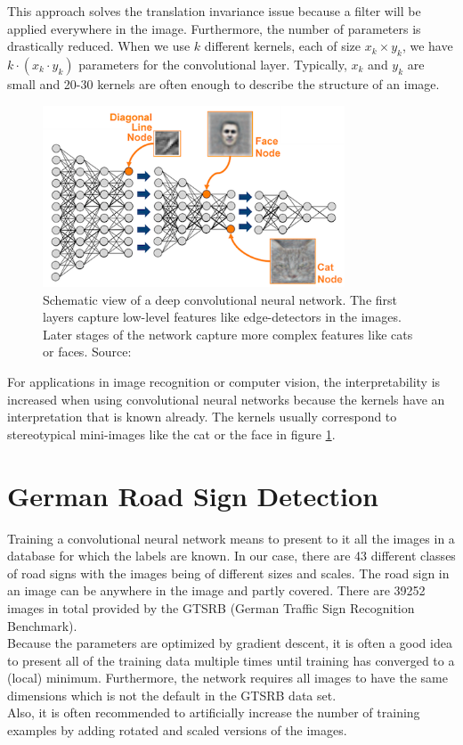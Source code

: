 \documentclass[11pt,a4paper]{article}
\begin{document}
This approach solves the translation invariance issue because a filter will be applied everywhere in the image. Furthermore, the number of parameters is drastically reduced. When we use $k$ different kernels, each of size $x_k \times y_k$, we have $k \cdot (x_k \cdot y_k)$ parameters for the convolutional layer. Typically, $x_k$ and $y_k$ are small and 20-30 kernels are often enough to describe the structure of an image.\\
\begin{figure}[h]
	\includegraphics[width=0.8\textwidth]{deep-learning.png}
	\centering
	\caption[Deep Convolutional Neural Network]{Schematic view of a deep convolutional neural network. The first layers capture low-level features like edge-detectors in the images. Later stages of the network capture more complex features like cats or faces. Source: \cite{deepNetworkImage}}
	\label{fig:deeplearning}
\end{figure}
For applications in image recognition or computer vision, the interpretability is increased when using convolutional neural networks because the kernels have an interpretation that is known already. The kernels usually correspond to stereotypical mini-images like the cat or the face in figure \ref{fig:deeplearning}.

\section{German Road Sign Detection}
Training a convolutional neural network means to present to it all the images in a database for which the labels are known. In our case, there are 43 different classes of road signs with the images being of different sizes and scales. The road sign in an image can be anywhere in the image and partly covered. There are 39252 images in total provided by the GTSRB (German Traffic Sign Recognition Benchmark).\\
Because the parameters are optimized by gradient descent, it is often a good idea to present all of the training data multiple times until training has converged to a (local) minimum. Furthermore, the network requires all images to have the same dimensions which is not the default in the GTSRB data set.\\
Also, it is often recommended to artificially increase the number of training examples by adding rotated and scaled versions of the images.
\end{document}
